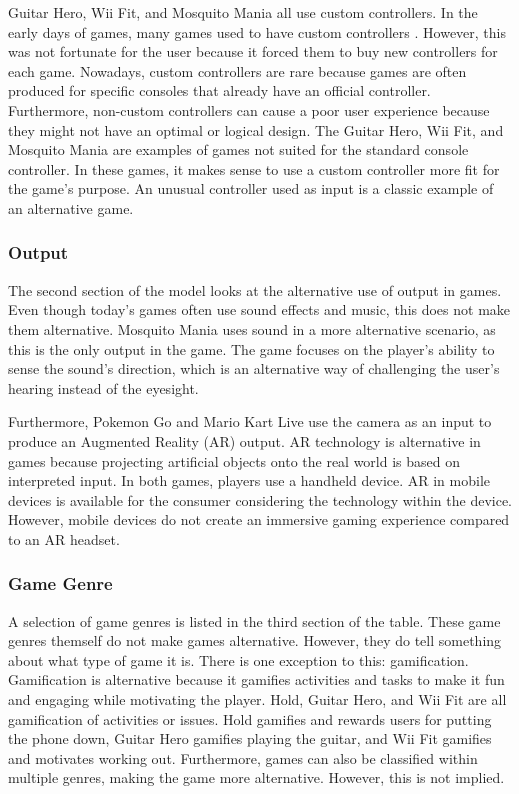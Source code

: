 \documentclass[../Main.tex]{subfiles}
\begin{document}
Guitar Hero, Wii Fit, and Mosquito Mania all use custom controllers. In the early days of games, many games used to have custom controllers \citep{overmars_brief_2012}. However, this was not fortunate for the user because it forced them to buy new controllers for each game. Nowadays, custom controllers are rare because games are often produced for specific consoles that already have an official controller. Furthermore, non-custom controllers can cause a poor user experience because they might not have an optimal or logical design. The Guitar Hero, Wii Fit, and Mosquito Mania are examples of games not suited for the standard console controller. In these games, it makes sense to use a custom controller more fit for the game's purpose. An unusual controller used as input is a classic example of an alternative game.

\subsubsection{Output}
The second section of the model looks at the alternative use of output in games. Even though today’s games often use sound effects and music, this does not make them alternative. Mosquito Mania uses sound in a more alternative scenario, as this is the only output in the game. The game focuses on the player's ability to sense the sound's direction, which is an alternative way of challenging the user's hearing instead of the eyesight.

Furthermore, Pokemon Go and Mario Kart Live use the camera as an input to produce an Augmented Reality (AR) output. AR technology is alternative in games because projecting artificial objects onto the real world is based on interpreted input. In both games, players use a handheld device. AR in mobile devices is available for the consumer considering the technology within the device. However, mobile devices do not create an immersive gaming experience compared to an AR headset.

\subsubsection{Game Genre}
A selection of game genres is listed in the third section of the table. These game genres themself do not make games alternative. However, they do tell something about what type of game it is. There is one exception to this: gamification. Gamification is alternative because it gamifies activities and tasks to make it fun and engaging while motivating the player. Hold, Guitar Hero, and Wii Fit are all gamification of activities or issues. Hold gamifies and rewards users for putting the phone down, Guitar Hero gamifies playing the guitar, and Wii Fit gamifies and motivates working out. Furthermore, games can also be classified within multiple genres, making the game more alternative. However, this is not implied.
\end{document}
